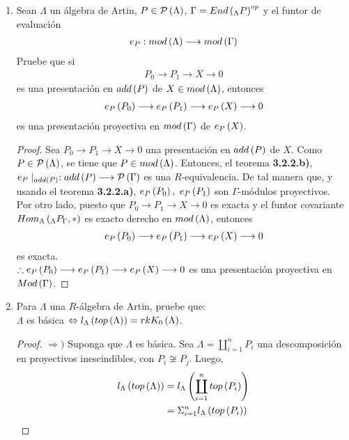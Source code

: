 \documentclass{article}
\begin{document}
\begin{enumerate}[label=\textbf{Ej \arabic*.}]
		\item Sean $\Lambda$ un álgebra de Artin, $P\in\mathcal{P}\left(\Lambda\right)$, $\Gamma = {End\left(_{\Lambda}P\right)}^{op}$ y el funtor de evaluación
		\begin{align*}
			e_{P}:mod\left(\Lambda\right)\longrightarrow mod\left(\Gamma\right)
		\end{align*}
		Pruebe que si
		\begin{align*}
			P_{0} \longrightarrow P_{1} \longrightarrow X \longrightarrow 0
		\end{align*}
		es una presentación en $add\left(P\right)$ de $X \in mod\left(\Lambda\right)$, entonces 
		\begin{align*}
			e_{P}\left(P_{0}\right) \longrightarrow e_{P}\left(P_{1}\right) \longrightarrow e_{P}\left(X\right) \longrightarrow 0
		\end{align*}
		es una presentación proyectiva en $mod\left(\Gamma\right)$ de $e_{P}\left(X\right)$.
		\begin{proof}
			Sea	$P_{0} \longrightarrow P_{1} \longrightarrow X \longrightarrow 0$ una presentación en $add\left(P\right)$ de $X$. Como $P\in\mathcal{P}\left(\Lambda\right)$,  se tiene que $P \in mod\left(\Lambda\right)$. Entonces, el teorema \textbf{3.2.2.b)}, $e_{P}\mid_{add\left(P\right)}:add\left(P\right)\longrightarrow\mathcal{P}\left(\Gamma\right)$ es una $R$-equivalencia. De tal manera que, y usando el teorema \textbf{3.2.2.a)}, $e_{P}\left(P_{0}\right),\ e_{P}\left(P_{1}\right)$ son $\Gamma$-módulos proyectivos.\\
			
			Por otro lado, puesto que $P_{0} \longrightarrow P_{1} \longrightarrow X \longrightarrow 0$ es exacta y el funtor covariante $\ringmodhom{\Lambda}{\ringbimod{\Lambda}{\Gamma}{P}{lr}}{*}$ es exacto derecho en $mod\left(\Lambda\right)$, entonces
			\begin{align*}
				e_{P}\left(P_{0}\right) \longrightarrow e_{P}\left(P_{1}\right) \longrightarrow e_{P}\left(X\right) \longrightarrow 0
			\end{align*}
			es exacta.\\
			$\therefore e_{P}\left(P_{0}\right) \longrightarrow e_{P}\left(P_{1}\right) \longrightarrow e_{P}\left(X\right) \longrightarrow 0$ es una presentación proyectiva en $Mod\left(\Gamma\right)$.
		\end{proof}
		
		\item Para $\Lambda$ una $R$-álgebra de Artin, pruebe que:\\
		$\Lambda$ es básica $\Leftrightarrow l_{\Lambda}\left(top\left(\Lambda\right)\right)=rkK_{0}\left(\Lambda\right)$.
		\begin{proof}
			$\boxed{\Rightarrow )}$ Suponga que $\Lambda$ es básica. Sea $\Lambda=\displaystyle\coprod_{i=1}^{n}P_{i}$ una descomposición en proyectivos inescindibles, con $P_{i} \not\cong P_{j}$. Luego,
			\begin{align*}
				l_{\Lambda}\left(top\left(\Lambda\right)\right)&=l_{\Lambda}\left(\displaystyle\coprod_{i=1}^{n}top\left(P_{i}\right)\right)\\
				&=\displaystyle\Sigma_{i=1}^{n}l_{\Lambda}\left(top\left(P_{i}\right)\right)
			\end{align*}
			

\end{proof}
\end{enumerate}
\end{document}
